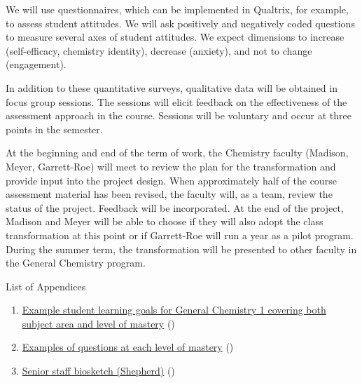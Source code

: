 \documentclass[10pt,letterpaper]{article}
\begin{document}
 We will use questionnaires, which can be implemented in Qualtrix, for example, to assess student attitudes. We will ask positively and negatively coded questions to measure several axes of student attitudes. We expect  dimensions to increase (self-efficacy, chemistry identity), decrease (anxiety), and not to change (engagement). 

 In addition to these quantitative surveys, qualitative data will be obtained in focus group sessions. The sessions will elicit feedback on the effectiveness of the assessment approach in the course. Sessions will be voluntary and occur at three points in the semester.

At the beginning and end of the term of work, the \pogil Chemistry faculty (Madison, Meyer, Garrett-Roe) will meet to review the plan for the transformation and provide input into the project design. When approximately half of the course assessment material has been revised, the \pogil faculty will, as a team, review the status of the project. Feedback will be incorporated. At the end of the project, Madison and Meyer will be able to choose if they will also adopt the class transformation at this point or if Garrett-Roe will run a year as a pilot program. During the summer term, the transformation will be presented to other faculty in the General Chemistry program.

\newpage
{}
List of Appendices
\begin{enumerate}
\item \hyperref[app:learning_objectives]{Example student learning goals for General Chemistry 1 covering both subject area and level of mastery} ()
\item \hyperref[app:example_questions]{Examples of questions at each level of mastery} ()
\item \hyperref[app:shepherd_biosketch]{Senior staff biosketch (Shepherd)} ()
\end{enumerate}

\raggedright\footnotesize\singlespacing
\renewcommand{\refname}{\large\textbf{References}}


% 

% 

\newpage
{}\label{app:learning_objectives}


\newpage
{}\label{app:example_questions}

\newpage
{}\label{app:shepherd_biosketch}
\end{document}
